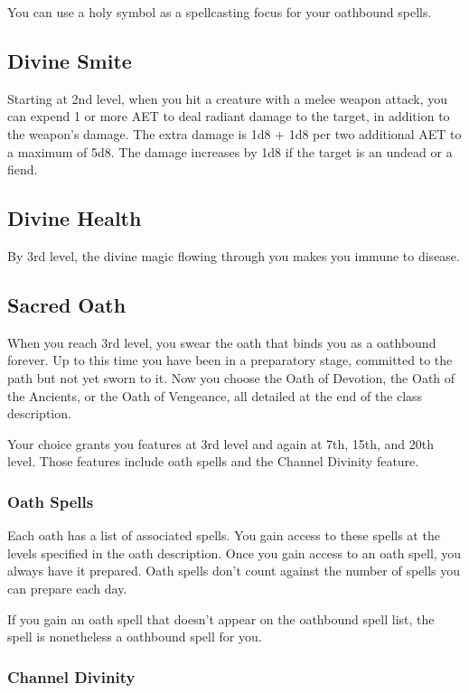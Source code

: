 You can use a holy symbol as a spellcasting focus for your oathbound spells.

\subsection{Divine Smite}

Starting at 2nd level, when you hit a creature with a melee weapon attack, you can expend 1 or more AET to deal radiant damage to the target, in addition to the weapon’s damage. The extra damage is 1d8 + 1d8 per two additional AET to a maximum of 5d8. The damage increases by 1d8 if the target is an undead or a fiend.

\subsection{Divine Health}

By 3rd level, the divine magic flowing through you makes you immune to disease.

\subsection{Sacred Oath}

When you reach 3rd level, you swear the oath that binds you as a oathbound forever. Up to this time you have been in a preparatory stage, committed to the path but not yet sworn to it. Now you choose the Oath of Devotion, the Oath of the Ancients, or the Oath of Vengeance, all detailed at the end of the class description.

Your choice grants you features at 3rd level and again at 7th, 15th, and 20th level. Those features include oath spells and the Channel Divinity feature.

\subsubsection{Oath Spells}

Each oath has a list of associated spells. You gain access to these spells at the levels specified in the oath description. Once you gain access to an oath spell, you always have it prepared. Oath spells don’t count against the number of spells you can prepare each day.

If you gain an oath spell that doesn’t appear on the oathbound spell list, the spell is nonetheless a oathbound spell for you.

\subsubsection{Channel Divinity}

